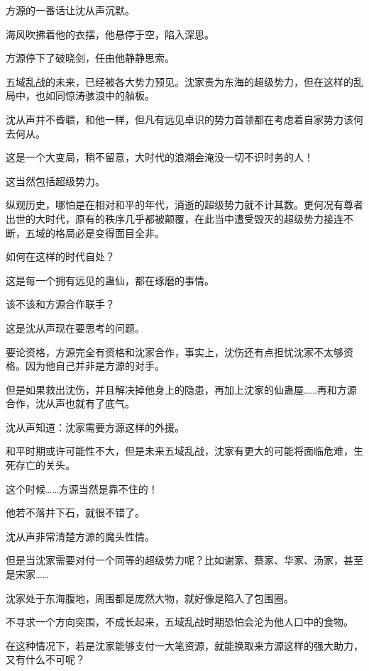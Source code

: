 
\begin{this_body}

方源的一番话让沈从声沉默。

海风吹拂着他的衣摆，他悬停于空，陷入深思。

方源停下了破晓剑，任由他静静思索。

五域乱战的未来，已经被各大势力预见。沈家贵为东海的超级势力，但在这样的乱局中，也如同惊涛骇浪中的舢板。

沈从声并不昏聩，和他一样，但凡有远见卓识的势力首领都在考虑着自家势力该何去何从。

这是一个大变局，稍不留意，大时代的浪潮会淹没一切不识时务的人！

这当然包括超级势力。

纵观历史，哪怕是在相对和平的年代，消逝的超级势力就不计其数。更何况有尊者出世的大时代，原有的秩序几乎都被颠覆，在此当中遭受毁灭的超级势力接连不断，五域的格局必是变得面目全非。

如何在这样的时代自处？

这是每一个拥有远见的蛊仙，都在琢磨的事情。

该不该和方源合作联手？

这是沈从声现在要思考的问题。

要论资格，方源完全有资格和沈家合作，事实上，沈伤还有点担忧沈家不太够资格。因为他自己并非是方源的对手。

但是如果救出沈伤，并且解决掉他身上的隐患，再加上沈家的仙蛊屋……再和方源合作，沈从声也就有了底气。

沈从声知道：沈家需要方源这样的外援。

和平时期或许可能性不大，但是未来五域乱战，沈家有更大的可能将面临危难，生死存亡的关头。

这个时候……方源当然是靠不住的！

他若不落井下石，就很不错了。

沈从声非常清楚方源的魔头性情。

但是当沈家需要对付一个同等的超级势力呢？比如谢家、蔡家、华家、汤家，甚至是宋家……

沈家处于东海腹地，周围都是庞然大物，就好像是陷入了包围圈。

不寻求一个方向突围，不成长起来，五域乱战时期恐怕会沦为他人口中的食物。

在这种情况下，若是沈家能够支付一大笔资源，就能换取来方源这样的强大助力，又有什么不可呢？


\end{this_body}
